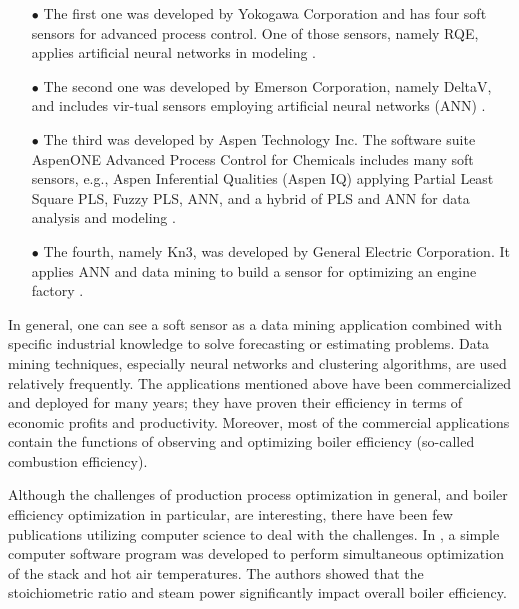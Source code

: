 \begin{itemize}

\item [$\bullet$] The first one was developed by Yokogawa Corporation and has four soft sensors for advanced process control. One of those sensors, namely RQE, applies artificial neural networks in modeling \cite{boi:ref_06}.
\item [$\bullet$] The second one was developed by Emerson Corporation, namely DeltaV, and includes vir-tual sensors employing artificial neural networks (ANN) \cite{boi:ref_03}.
\item [$\bullet$] The third was developed by Aspen Technology Inc. The software suite AspenONE Advanced Process Control for Chemicals includes many soft sensors, e.g., Aspen Inferential Qualities (Aspen IQ) applying Partial Least Square  PLS, Fuzzy PLS, ANN, and a hybrid of PLS and ANN for data analysis and modeling \cite{boi:ref_05}.
\item [$\bullet$] The fourth, namely Kn3, was developed by General Electric Corporation. It applies ANN and data mining to build a sensor for optimizing an engine factory \cite{boi:ref_07}. 

\end{itemize}

In general, one can see a soft sensor as a data mining application combined with specific industrial knowledge to solve forecasting or estimating problems. Data mining techniques, especially neural networks and clustering algorithms, are used relatively frequently. The applications mentioned above have been commercialized and deployed for many years; they have proven their efficiency in terms of economic profits and productivity. Moreover, most of the commercial applications contain the functions of observing and optimizing boiler efficiency (so-called combustion efficiency).

Although the challenges of production process optimization in general, and boiler efficiency optimization in particular, are interesting, there have been few publications utilizing computer science to deal with the challenges. In \cite{boi:ref_13}, a simple computer software program was developed to perform simultaneous optimization of the stack and hot air temperatures. The authors showed that the stoichiometric ratio and steam power significantly impact overall boiler efficiency. 

